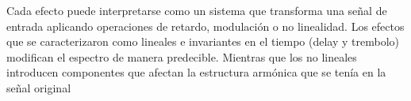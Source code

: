 \documentclass[12pt]{article}
\begin{document}
Cada efecto puede interpretarse como un sistema que transforma una señal de entrada aplicando operaciones de retardo, modulación o no linealidad. Los efectos que se caracterizaron como lineales e invariantes en el tiempo (delay y trembolo) modifican el espectro de manera predecible. Mientras que los no lineales introducen componentes que afectan la estructura armónica que se tenía en la señal original

\end{document}
